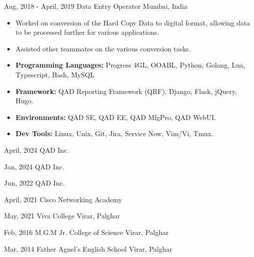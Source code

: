 \documentclass{curriculum-vitae}
\begin{document}
{Aug, 2018 - April, 2019}
{Data Entry Operator}
{Mumbai, India}

\begin{itemize}
   \item Worked on conversion of the Hard Copy Data to digital format, allowing
      data to be processed further for various applications.
   \item Assisted other teammates on the various conversion tasks.
\end{itemize}


\begin{itemize}
   \item \textbf{Programming Languages:} Progress 4GL, OOABL, Python, Golang, Lua, Typescript, Bash, MySQL
   \item \textbf{Framework:} QAD Reporting Framework (QRF), Django, Flask, jQuery, Hugo.
   \item \textbf{Environments:} QAD SE, QAD EE, QAD MfgPro, QAD WebUI.
   \item \textbf{Dev Tools:} Linux, Unix, Git, Jira, Service Now, Vim/Vi, Tmux.
\end{itemize}


{April, 2024}
{QAD Inc.}
{}

{Jan, 2024}
{QAD Inc.}
{}

{Jun, 2022}
{QAD Inc.}
{}

{April, 2021}
{Cisco Networking Academy}
{}


{May, 2021}
{Viva College}
{Virar, Palghar}

{Feb, 2016}
{M.G.M Jr. College of Science}
{Virar, Palghar}

{Mar, 2014}
{Father Agnel's English School}
{Virar, Palghar}
\end{document}
